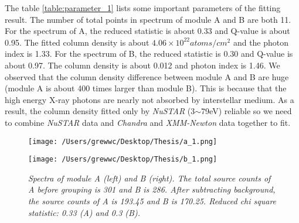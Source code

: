 \documentclass[12pt]{report}
\newcommand{\mycaption}[1]{\caption{\textit{\footnotesize #1}}}
\begin{document}
        \indent
        The table \ref{table:parameter_1} lists some important parameters of the fitting result. 
        The number of total points in spectrum of module A and B are both 11. For the spectrum of A, the 
        reduced statistic is about 0.33 and Q-value is about 0.95. The fitted column density is about 
        $4.06\times 10^{22} atoms/cm^2$ and the photon index is 1.33. For the spectrum of B, the reduced statistic is
        0.30 and Q-value is about 0.97. The column density is about 0.012 and photon index is 1.46. We observed that
        the column density difference between module A and B are huge (module A is about 400 times larger than 
        module B). This 
        is because that the high energy X-ray photons are nearly not absorbed by interstellar medium. As a result, 
        the column density fitted only by \textit{NuSTAR} (3$\sim$79eV) reliable so we need to combine 
        \textit{NuSTAR} data and \textit{Chandra} and \textit{XMM-Newton} data together to fit.\\ 
        \begin{figure}[!ht]
          \begin{minipage}{0.45\textwidth}
            \begin{flushleft} 
                \texttt{[image: /Users/grewwc/Desktop/Thesis/a\_1.png]}
            \end{flushleft}
            \end{minipage}
          \begin{minipage}{0.45\textwidth}
            \begin{flushleft}
            \texttt{[image: /Users/grewwc/Desktop/Thesis/b\_1.png]}
            \end{flushleft}
          \end{minipage}
          \centering
          \begin{minipage}{0.8\textwidth}
          \mycaption{Spectra of module A (left) and B (right). The total source counts of A before grouping is 
                      301 and B is 286. After subtracting background, the source counts of A is 193.45 and B is
                      170.25. Reduced chi square statistic: 0.33 (A) and 0.3 (B).}
          \label{spectra}
          \end{minipage}
          \end{figure}
          \\
\end{document}
